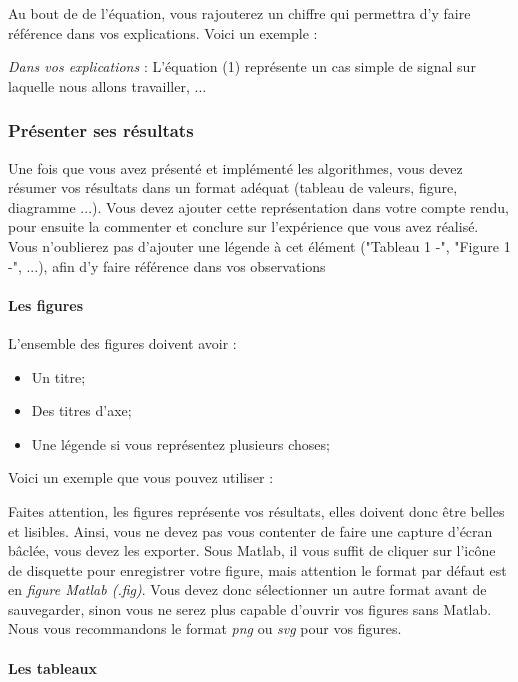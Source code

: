 \documentclass[11pt]{article}
\providecommand{\tightlist}{%
      \setlength{\itemsep}{0pt}\setlength{\parskip}{0pt}}
\begin{document}
Au bout de de l'équation, vous rajouterez un chiffre qui permettra d'y
faire référence dans vos explications. Voici un exemple :

\emph{Dans vos explications} : L'équation (1) représente un cas simple
de signal sur laquelle nous allons travailler, ...

    \subsubsection{Présenter ses
résultats}\label{pruxe9senter-ses-ruxe9sultats}

Une fois que vous avez présenté et implémenté les algorithmes, vous
devez résumer vos résultats dans un format adéquat (tableau de valeurs,
figure, diagramme ...). Vous devez ajouter cette représentation dans
votre compte rendu, pour ensuite la commenter et conclure sur
l'expérience que vous avez réalisé. Vous n'oublierez pas d'ajouter une
légende à cet élément ("Tableau 1 -", "Figure 1 -", ...), afin d'y faire
référence dans vos observations

\paragraph{Les figures}\label{les-figures}

L'ensemble des figures doivent avoir :

\begin{itemize}
\tightlist
\item
  Un titre;
\item
  Des titres d'axe;
\item
  Une légende si vous représentez plusieurs choses;
\end{itemize}

Voici un exemple que vous pouvez utiliser :

Faites attention, les figures représente vos résultats, elles doivent
donc être belles et lisibles. Ainsi, vous ne devez pas vous contenter de
faire une capture d'écran bâclée, vous devez les exporter. Sous Matlab,
il vous suffit de cliquer sur l'icône de disquette pour enregistrer
votre figure, mais attention le format par défaut est en \emph{figure
Matlab (.fig)}. Vous devez donc sélectionner un autre format avant de
sauvegarder, sinon vous ne serez plus capable d'ouvrir vos figures sans
Matlab. Nous vous recommandons le format \emph{png} ou \emph{svg} pour
vos figures.

\paragraph{Les tableaux}\label{les-tableaux}
\end{document}
